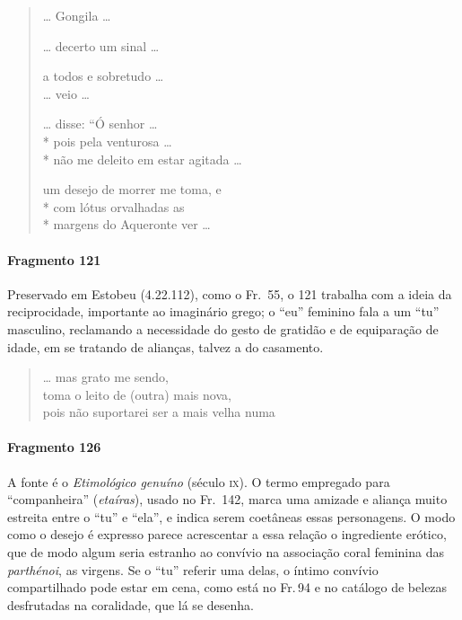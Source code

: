 {\begin{verse}
\ldots{} Gongila \ldots{}

\ldots{} decerto um sinal \ldots{}

a todos e sobretudo \ldots{}\\
\ldots{} veio \ldots{}

\ldots{} disse: “Ó senhor \ldots{}\\*
pois pela venturosa \ldots{}\\*
não me deleito em estar agitada \ldots{}

um desejo de morrer me toma, e\\*
com lótus orvalhadas as\\*
margens do Aqueronte ver \ldots{}
\end{verse}


\paragraph{Fragmento 121}

{\small Preservado em Estobeu (4.22.112), como o Fr.~55, o 121 trabalha com a ideia da
reciprocidade, importante ao imaginário grego; o “eu” feminino fala a um “tu”
masculino, reclamando a necessidade do gesto de gratidão e de equiparação de
idade, em se tratando de alianças, talvez a do casamento.}


\begin{verse}
\ldots{} mas grato me sendo,\\
toma o leito de (outra) mais nova, \\
pois não suportarei ser a mais velha numa 
\end{verse}


\paragraph{Fragmento 126}

{\small A fonte é o \textit{Etimológico genuíno }(século \textsc{ix}). O termo empregado para
“companheira” (\textit{etaíras}), usado no Fr.~142, marca uma amizade e aliança muito estreita entre o “tu”
e “ela”, e indica serem coetâneas essas personagens. O modo como o desejo é expresso parece acrescentar a essa relação o
ingrediente erótico, que de modo algum seria estranho ao convívio na associação coral feminina das \textit{parthénoi}, as virgens. Se o ``tu'' referir uma delas, o íntimo convívio compartilhado pode estar em cena, como está no Fr.\,94 e no catálogo de belezas desfrutadas na coralidade, que lá se desenha.}

}
